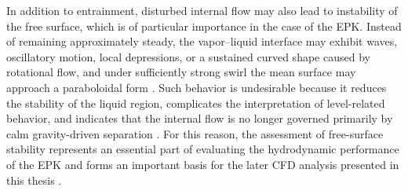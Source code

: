 In addition to entrainment, disturbed internal flow may also lead to instability of the free surface, which is of particular importance in the case of the EPK. Instead of remaining approximately steady, the vapor--liquid interface may exhibit waves, oscillatory motion, local depressions, or a sustained curved shape caused by rotational flow, and under sufficiently strong swirl the mean surface may approach a paraboloidal form \cite{CarusoEtAl2016,CristofanoEtAl2014}. Such behavior is undesirable because it reduces the stability of the liquid region, complicates the interpretation of level-related behavior, and indicates that the internal flow is no longer governed primarily by calm gravity-driven separation \cite{IshiiHibiki2011}. For this reason, the assessment of free-surface stability represents an essential part of evaluating the hydrodynamic performance of the EPK and forms an important basis for the later CFD analysis presented in this thesis \cite{IshiiHibiki2011,LeeEtAl2019}.